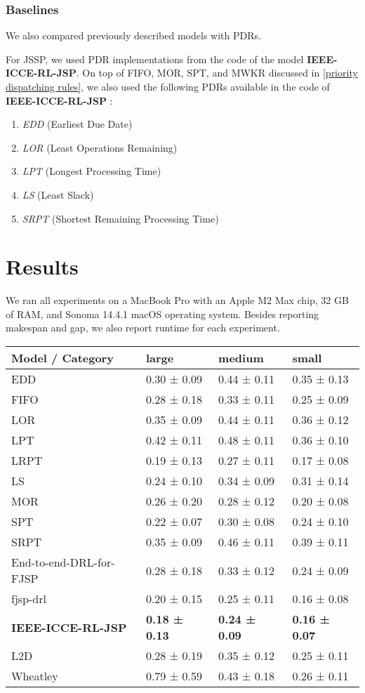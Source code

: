 \subsubsection{Baselines}
We also compared previously described models with PDRs.
\par
For JSSP, we used PDR implementations from the code of the model \textbf{IEEE-ICCE-RL-JSP}. On top of FIFO, MOR, SPT, and MWKR discussed in \ref{priority dispatching rules}, we also used the following PDRs available in the code of \textbf{IEEE-ICCE-RL-JSP} \cite{github_IEEE-ICCE-RL-JSP}:
\begin{enumerate}
    \item \textit{EDD} (Earliest Due Date)
    \item \textit{LOR} (Least Operations Remaining)
    \item \textit{LPT} (Longest Processing Time)
    \item \textit{LS} (Least Slack)
    \item \textit{SRPT} (Shortest Remaining Processing Time)
\end{enumerate}

\section{Results}
We ran all experiments on a MacBook Pro with an Apple M2 Max chip, 32 GB of RAM, and Sonoma 14.4.1 macOS operating system. Besides reporting makespan and gap, we also report runtime for each experiment.

\begin{tabular}{llll}
    \toprule
    Model / Category & large & medium & small \\
    \midrule
    EDD & 0.30 ± 0.09 & 0.44 ± 0.11 & 0.35 ± 0.13 \\
    FIFO & 0.28 ± 0.18 & 0.33 ± 0.11 & 0.25 ± 0.09 \\
    LOR & 0.35 ± 0.09 & 0.44 ± 0.11 & 0.36 ± 0.12 \\
    LPT & 0.42 ± 0.11 & 0.48 ± 0.11 & 0.36 ± 0.10 \\
    LRPT & 0.19 ± 0.13 & 0.27 ± 0.11 & 0.17 ± 0.08 \\
    LS & 0.24 ± 0.10 & 0.34 ± 0.09 & 0.31 ± 0.14 \\
    MOR & 0.26 ± 0.20 & 0.28 ± 0.12 & 0.20 ± 0.08 \\
    SPT & 0.22 ± 0.07 & 0.30 ± 0.08 & 0.24 ± 0.10 \\
    SRPT & 0.35 ± 0.09 & 0.46 ± 0.11 & 0.39 ± 0.11 \\
    End-to-end-DRL-for-FJSP & 0.28 ± 0.18 & 0.33 ± 0.12 & 0.24 ± 0.09 \\
    fjsp-drl & 0.20 ± 0.15 & 0.25 ± 0.11 & 0.16 ± 0.08 \\
    \textbf{IEEE-ICCE-RL-JSP} & \textbf{0.18 ± 0.13} & \textbf{0.24 ± 0.09} & \textbf{0.16 ± 0.07} \\
    L2D & 0.28 ± 0.19 & 0.35 ± 0.12 & 0.25 ± 0.11 \\
    Wheatley & 0.79 ± 0.59 & 0.43 ± 0.18 & 0.26 ± 0.11 \\
    \bottomrule
\end{tabular}

